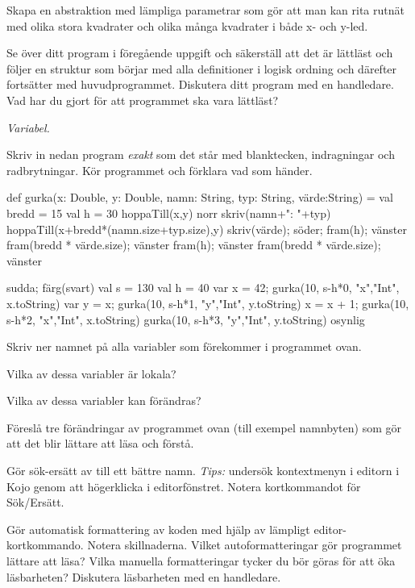 \Subtask Skapa en abstraktion  med lämpliga parametrar som gör att man kan rita rutnät med olika stora kvadrater och olika många kvadrater i både x- och y-led.

\Subtask\Checkpoint Se över ditt program i föregående uppgift och säkerställ att det är lättläst och följer en struktur som börjar med alla definitioner i logisk ordning och därefter fortsätter med huvudprogrammet. Diskutera ditt program med en handledare. Vad har du gjort för att programmet ska vara lättläst?


\Task \emph{Variabel.}

\Subtask Skriv in nedan program \emph{exakt} som det står med blanktecken, indragningar och radbrytningar. Kör programmet och förklara vad som händer.

\begin{Code}
def gurka(x: Double,
          y: Double, namn: String,
          typ: String,
          värde:String) = {
  val bredd = 15
  val h = 30
  hoppaTill(x,y)
  norr
  skriv(namn+": "+typ)
  hoppaTill(x+bredd*(namn.size+typ.size),y)
  skriv(värde); söder; fram(h); vänster
  fram(bredd * värde.size); vänster
  fram(h); vänster
  fram(bredd * värde.size); vänster
}

sudda; färg(svart)
val s = 130
val h = 40
var x = 42; gurka(10, s-h*0, "x","Int", x.toString)
var y = x;  gurka(10, s-h*1, "y","Int", y.toString)
x = x + 1;  gurka(10, s-h*2, "x","Int", x.toString)
            gurka(10, s-h*3, "y","Int", y.toString)
osynlig
\end{Code}

\Subtask\Pen Skriv ner namnet på alla variabler som förekommer i programmet ovan. 

\Subtask\Pen Vilka av dessa variabler är lokala? 

\Subtask\Pen Vilka av dessa variabler kan förändras?

\Subtask\Pen Föreslå tre förändringar av programmet ovan (till exempel namnbyten) som gör att det blir lättare att läsa och förstå.

\Subtask Gör sök-ersätt av  till ett bättre namn. \emph{Tips:} undersök kontextmenyn i editorn i Kojo genom att högerklicka i editorfönstret. Notera kortkommandot för Sök/Ersätt.

\Subtask\Checkpoint Gör automatisk formattering av koden med hjälp av lämpligt editor-kortkommando. Notera skillnaderna. Vilket autoformatteringar gör programmet lättare att läsa? Vilka manuella formatteringar  tycker du bör göras för att öka läsbarheten? Diskutera läsbarheten med en handledare. 

